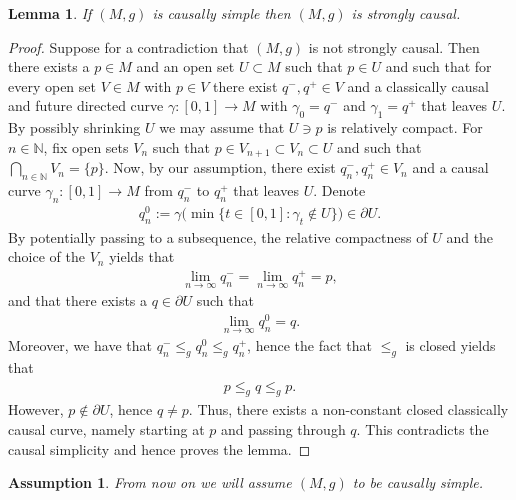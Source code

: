 \documentclass[a4paper,10pt]{article}
\newtheorem{lemma}[theorem]{Lemma}
\newtheorem{assumption}[theorem]{Assumption}
\numberwithin{equation}{section}
\newcommand{\N}{\mathbb{N}}
\begin{document}
\begin{lemma}\label{simple_to_strong_causal}
    If $(M,g)$ is causally simple then $(M, g)$ is strongly causal.
\end{lemma}
\begin{proof}
    Suppose for a contradiction that $(M, g)$ is not strongly causal. Then there exists a $p\in M$ and an open set $U \subset M$ such that $p \in U$ and such that for every open set $V\in M$ with $p \in V$ there exist $q^-, q^+ \in V$ and a classically causal and future directed curve $\gamma:[0,1] \to M$ with $\gamma_0=q^-$ and $\gamma_1 = q^+$ that leaves $U$.
    By possibly shrinking $U$ we may assume that $U \ni p$ is relatively compact. For $n \in \N$, fix open sets $V_n$ such that $p \in V_{n+1} \subset V_n \subset U$ and such that $\bigcap_{n \in \N} V_n = \{p\}$.
    Now, by our assumption, there exist $q_n^-, q_n^+ \in V_n$ and a causal curve $\gamma_n:[0,1] \to M$ from $q_n^-$ to $q_n^+$ that leaves $U$. Denote 
    \begin{align*}
        q_n^0:= \gamma\big(\min\{t \in [0,1]: \gamma_t \notin U\}\big) \in \partial U.
    \end{align*}
    By potentially passing to a subsequence, the relative compactness of $U$ and the choice of the $V_n$ yields that 
    \begin{align*}
        \lim_{n \to \infty} q_n^- = \lim_{n \to \infty} q_n^+ = p,
    \end{align*}
    and that there exists a $q \in \partial U$ such that 
    \begin{align*}
        \lim_{n \to \infty} q_n^0 = q.
    \end{align*}
    Moreover, we have that $q_n^- \leq_g q_n^0 \leq_g q_n^+$, hence the fact that $\leq_g$ is closed yields that 
    \begin{align*}
        p \leq_g q \leq_g p.
    \end{align*}
    However, $p \notin \partial U$, hence $q \neq p$. Thus, there exists a non-constant closed classically causal curve, namely starting at $p$ and passing through $q$. This contradicts the causal simplicity and hence proves the lemma. 
\end{proof}
\begin{assumption}
    From now on we will assume $(M, g)$ to be causally simple.
\end{assumption}
\smallskip
\end{document}
